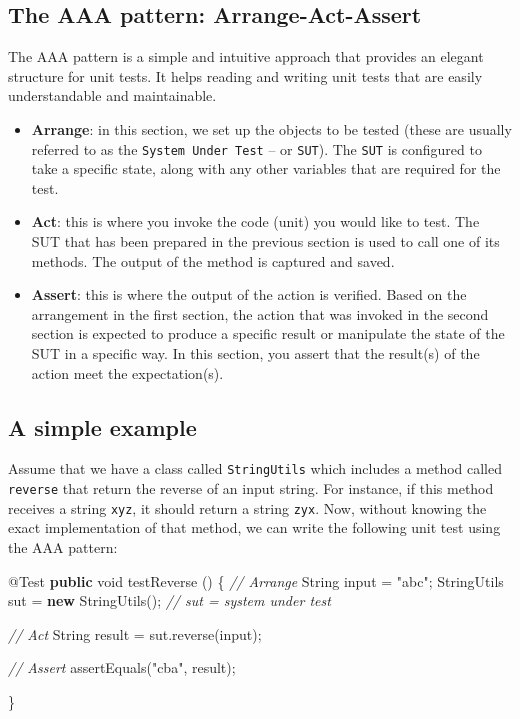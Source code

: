\documentclass[
]{book}
\newenvironment{Shaded}{\begin{snugshade}}{\end{snugshade}}
\newcommand{\AttributeTok}[1]{\textcolor[rgb]{0.77,0.63,0.00}{#1}}
\newcommand{\BuiltInTok}[1]{#1}
\newcommand{\CommentTok}[1]{\textcolor[rgb]{0.56,0.35,0.01}{\textit{#1}}}
\newcommand{\DataTypeTok}[1]{\textcolor[rgb]{0.13,0.29,0.53}{#1}}
\newcommand{\FunctionTok}[1]{\textcolor[rgb]{0.00,0.00,0.00}{#1}}
\newcommand{\KeywordTok}[1]{\textcolor[rgb]{0.13,0.29,0.53}{\textbf{#1}}}
\newcommand{\NormalTok}[1]{#1}
\newcommand{\StringTok}[1]{\textcolor[rgb]{0.31,0.60,0.02}{#1}}
\providecommand{\tightlist}{%
  \setlength{\itemsep}{0pt}\setlength{\parskip}{0pt}}
\begin{document}
\hypertarget{aaa}{%
\subsection{The AAA pattern: Arrange-Act-Assert}\label{aaa}}

The AAA pattern is a simple and intuitive approach that provides an elegant structure for unit tests. It helps reading and writing unit tests that are easily understandable and maintainable.

\begin{itemize}
\tightlist
\item
  \textbf{Arrange}: in this section, we set up the objects to be tested (these are usually referred to as the \texttt{System\ Under\ Test} -- or \texttt{SUT}). The \texttt{SUT} is configured to take a specific state, along with any other variables that are required for the test.
\item
  \textbf{Act}: this is where you invoke the code (unit) you would like to test. The SUT that has been prepared in the previous section is used to call one of its methods. The output of the method is captured and saved.
\item
  \textbf{Assert}: this is where the output of the action is verified. Based on the arrangement in the first section, the action that was invoked in the second section is expected to produce a specific result or manipulate the state of the SUT in a specific way. In this section, you assert that the result(s) of the action meet the expectation(s).
\end{itemize}

\hypertarget{a-simple-example}{%
\subsection{A simple example}\label{a-simple-example}}

Assume that we have a class called \texttt{StringUtils} which includes a method called \texttt{reverse} that return the reverse of an input string. For instance, if this method receives a string \texttt{xyz}, it should return a string \texttt{zyx}. Now, without knowing the exact implementation of that method, we can write the following unit test using the AAA pattern:

\begin{Shaded}
\begin{Highlighting}[]
\AttributeTok{@Test}
\KeywordTok{public} \DataTypeTok{void} \FunctionTok{testReverse}\NormalTok{ () \{}
    \CommentTok{// Arrange}
    \BuiltInTok{String}\NormalTok{ input = }\StringTok{"abc"}\NormalTok{;}
\NormalTok{    StringUtils sut = }\KeywordTok{new} \FunctionTok{StringUtils}\NormalTok{(); }\CommentTok{// sut = system under test}

    \CommentTok{// Act}
    \BuiltInTok{String}\NormalTok{ result = sut.}\FunctionTok{reverse}\NormalTok{(input);}

    \CommentTok{// Assert}
    \FunctionTok{assertEquals}\NormalTok{(}\StringTok{"cba"}\NormalTok{, result);}

\NormalTok{\}}
\end{Highlighting}
\end{Shaded}
\end{document}
